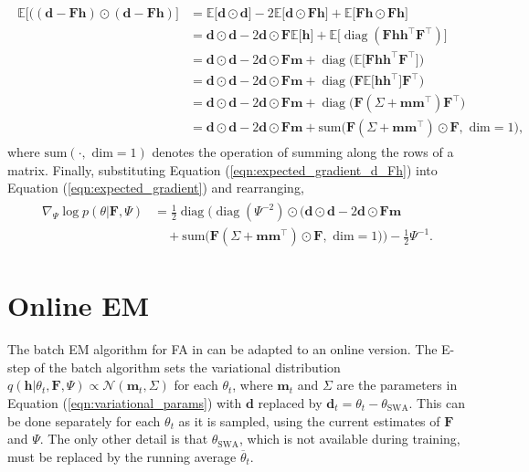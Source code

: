 \documentclass[msc,deptreport.inf]{infthesis} %
\newcommand{\matr}[1]{\mathbf{#1}}
\newcommand{\E}{\mathbb E}
\newcommand{\diag}{\mathop{\mathrm{diag}}}
\begin{document}
\begin{align}\label{eqn:expected_gradient_d_Fh}
\begin{split}
	\E \big[\big((\matr{d} - \matr{Fh}) \odot (\matr{d} - \matr{Fh})\big] 
	& = \E \big[\matr{d} \odot \matr{d} \big] - 2\E \big[ \matr{d} \odot \matr{Fh} \big] + \E \big[ \matr{Fh} \odot \matr{Fh} \big] \\
	& = \matr{d} \odot \matr{d} - 2\matr{d} \odot \matr{F} \E \big[ \matr{h} \big] + \E \big[ \diag(\matr{Fhh^\intercal F^\intercal}) \big] \\
	& = \matr{d} \odot \matr{d} - 2\matr{d} \odot \matr{F} \matr{m} + \diag\big(\E \big[ \matr{Fhh^\intercal F^\intercal} \big]\big) \\
	& = \matr{d} \odot \matr{d} - 2\matr{d} \odot \matr{F} \matr{m} + \diag\big( \matr{F} \E \big[ \matr{hh^\intercal} \big] \matr{F}^\intercal \big) \\
	& = \matr{d} \odot \matr{d} - 2\matr{d} \odot \matr{F} \matr{m} + \diag\big( \matr{F} (\Sigma + \matr{m} \matr{m}^\intercal) \matr{F}^\intercal \big) \\
	& = \matr{d} \odot \matr{d} - 2\matr{d} \odot \matr{F} \matr{m} + \text{sum}\big(\matr{F} (\Sigma + \matr{m} \matr{m}^\intercal) \odot \matr{F}, \text{ dim} = 1\big),
\end{split}
\end{align} 
where $\text{sum}(\cdot, \text{ dim} = 1)$ denotes the operation of summing along the rows of a matrix. Finally, substituting Equation (\ref{eqn:expected_gradient_d_Fh}) into Equation (\ref{eqn:expected_gradient}) and rearranging, 
\begin{align}
\begin{split}
	\nabla_{\Psi} \log p(\theta | \matr{F}, \Psi) 
	& = \frac{1}{2} \diag\Big(\diag(\Psi^{-2}) \odot \big(\matr{d} \odot \matr{d} - 2\matr{d} \odot \matr{F} \matr{m} \\
	& \quad + \text{sum}\big(\matr{F} (\Sigma + \matr{m} \matr{m}^\intercal) \odot \matr{F}, \text{ dim} = 1\big) \Big)
	 - \frac{1}{2} \Psi^{-1}.
\end{split}
\end{align} 


\section{Online EM}\label{sec:online_em}

The batch EM algorithm for FA in \cite{barber2007} can be adapted to an online version. The E-step of the batch algorithm sets the variational distribution $q(\matr{h} | \theta_t, \matr{F}, \Psi) \propto \mathcal{N}(\matr{m}_t, \Sigma)$ for each $\theta_t$, where $\matr{m}_t$ and $\Sigma$ are the parameters in Equation (\ref{eqn:variational_params}) with $\matr{d}$ replaced by $\matr{d}_t = \theta_t - \theta_{\text{SWA}}$. This can be done separately for each $\theta_t$ as it is sampled, using the current estimates of $\matr{F}$ and $\Psi$. The only other detail is that $\theta_{\text{SWA}}$, which is not available during training, must be replaced by the running average $\overline{\theta}_t$.
\end{document}
